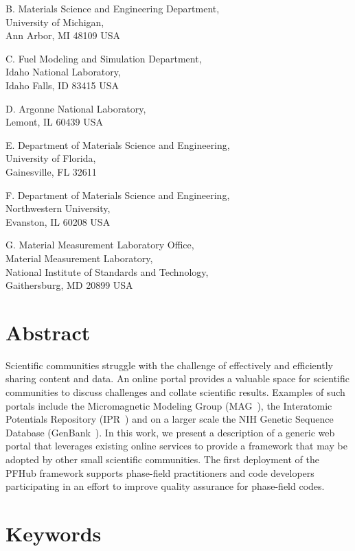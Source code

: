 \documentclass{jors}
\begin{document}
B. Materials Science and Engineering Department, \\
University of Michigan, \\
Ann Arbor, MI 48109 USA

C. Fuel Modeling and Simulation Department, \\
Idaho National Laboratory, \\
Idaho Falls, ID 83415 USA

D. Argonne National Laboratory, \\
Lemont, IL 60439 USA

E. Department of Materials Science and Engineering, \\
University of Florida, \\
Gainesville, FL 32611

F. Department of Materials Science and Engineering, \\
Northwestern University, \\
Evanston, IL 60208 USA

G. Material Measurement Laboratory Office, \\
Material Measurement Laboratory, \\
National Institute of Standards and Technology,\\
Gaithersburg, MD 20899 USA


\section*{Abstract}

Scientific communities struggle with the challenge of effectively and
efficiently sharing content and data. An online portal provides a
valuable space for scientific communities to discuss challenges and
collate scientific results. Examples of such portals include the
Micromagnetic Modeling Group (\textmu MAG~\cite{mumag}), the
Interatomic Potentials Repository (IPR~\cite{ipr1, ipr2}) and on a
larger scale the NIH Genetic Sequence Database
(GenBank~\cite{genbank}). In this work, we present a description of a
generic web portal that leverages existing online services to provide
a framework that may be adopted by other small scientific
communities. The first deployment of the PFHub framework supports
phase-field practitioners and code developers participating in an
effort to improve quality assurance for phase-field codes.

\section*{Keywords}
\end{document}
